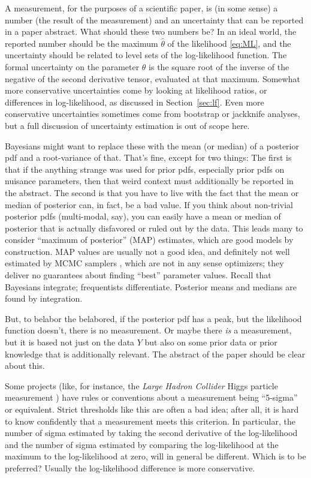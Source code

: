 \documentclass{article}
\newcommand{\sectionname}{Section}
\newcommand{\secref}[1]{\sectionname~\ref{#1}}
\begin{document}
A measurement, for the purposes of a scientific paper, is (in some sense) a number (the result of the measurement) and an uncertainty that can be reported in a paper abstract.
What should these two numbers be?
In an ideal world, the reported number should be the maximum $\hat\theta$ of the likelihood \eqref{eq:ML}, and the uncertainty should be related to level sets of the log-likelihood function.
The formal uncertainty on the parameter $\theta$ is the square root of the inverse of the negative of the second derivative tensor, evaluated at that maximum.
Somewhat more conservative uncertainties come by looking at likelihood ratios, or differences in log-likelihood, as discussed in \secref{sec:lf}.
Even more conservative uncertainties sometimes come from bootstrap \cite{bootstrap} or jackknife \cite{jackknife} analyses, but a full discussion of uncertainty estimation is out of scope here.

Bayesians might want to replace these with the mean (or median) of a posterior pdf and a root-variance of that.
That's fine, except for two things:
The first is that if the anything strange was used for prior pdfs, especially prior pdfs on nuisance parameters, then that weird context must additionally be reported in the abstract.
The second is that you have to live with the fact that the mean or median of posterior can, in fact, be a bad value.
If you think about non-trivial posterior pdfs (multi-modal, say), you can easily have a mean or median of posterior that is actually disfavored or ruled out by the data.
This leads many to consider ``maximum of posterior'' (MAP) estimates, which are good models by construction.
MAP values are usually not a good idea, and definitely not well estimated by MCMC samplers \cite{mcmc}, which are not in any sense optimizers; they deliver no guarantees about finding ``best'' parameter values.
Recall that Bayesians integrate; frequentists differentiate.
Posterior means and medians are found by integration.

But, to belabor the belabored, if the posterior pdf has a peak, but the likelihood function doesn't, there is no measurement.
Or maybe there \emph{is} a measurement, but it is based not just on the data $Y$ but also on some prior data or prior knowledge that is additionally relevant.
The abstract of the paper should be clear about this.

Some projects (like, for instance, the \textsl{Large Hadron Collider} Higgs particle measurement \cite{lhc}) have rules or conventions about a measurement being ``5-sigma'' or equivalent.
Strict thresholds like this are often a bad idea; after all, it is hard to know confidently that a measurement meets this criterion.
In particular, the number of sigma estimated by taking the second derivative of the log-likelihood and the number of sigma estimated by comparing the log-likelihood at the maximum to the log-likelihood at zero, will in general be different.
Which is to be preferred?
Usually the log-likelihood difference is more conservative.
\end{document}
